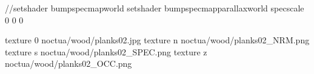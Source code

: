 //setshader bumpspecmapworld
setshader bumpspecmapparallaxworld
specscale 0 0 0

texture 0 noctua/wood/planks02.jpg
texture n noctua/wood/planks02_NRM.png
texture s noctua/wood/planks02_SPEC.png
texture z noctua/wood/planks02_OCC.png

